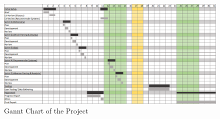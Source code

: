 \begin{figure}[H]
	\caption{Gannt Chart of the Project}
	\label{fig:gannt}
	\begin{center}
	\includegraphics[width=\textwidth]{Graphics/Gannt}
	\end{center}
\end{figure}